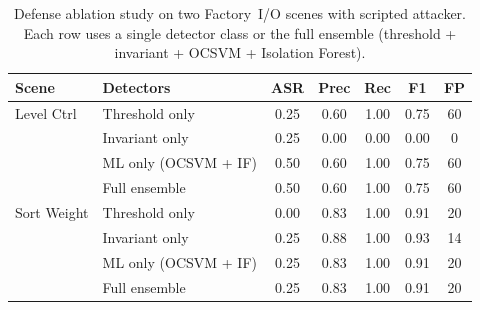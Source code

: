 %
\begin{table}[t]
\centering
\caption{Defense ablation study on two Factory~I/O scenes with scripted attacker. Each row uses a single detector class or the full ensemble (threshold + invariant + OCSVM + Isolation Forest).}
\label{tab:ablation}
\small
\setlength{\tabcolsep}{4pt}
\begin{tabular}{llccccc}
\toprule
\textbf{Scene} & \textbf{Detectors} & \textbf{ASR} & \textbf{Prec} & \textbf{Rec} & \textbf{F1} & \textbf{FP} \\
\midrule
Level Ctrl & Threshold only & 0.25 & 0.60 & 1.00 & 0.75 & 60 \\
 & Invariant only & 0.25 & 0.00 & 0.00 & 0.00 & 0 \\
 & ML only (OCSVM + IF) & 0.50 & 0.60 & 1.00 & 0.75 & 60 \\
 & Full ensemble & 0.50 & 0.60 & 1.00 & 0.75 & 60 \\
\midrule
Sort Weight & Threshold only & 0.00 & 0.83 & 1.00 & 0.91 & 20 \\
 & Invariant only & 0.25 & 0.88 & 1.00 & 0.93 & 14 \\
 & ML only (OCSVM + IF) & 0.25 & 0.83 & 1.00 & 0.91 & 20 \\
 & Full ensemble & 0.25 & 0.83 & 1.00 & 0.91 & 20 \\
\bottomrule
\end{tabular}
\end{table}
